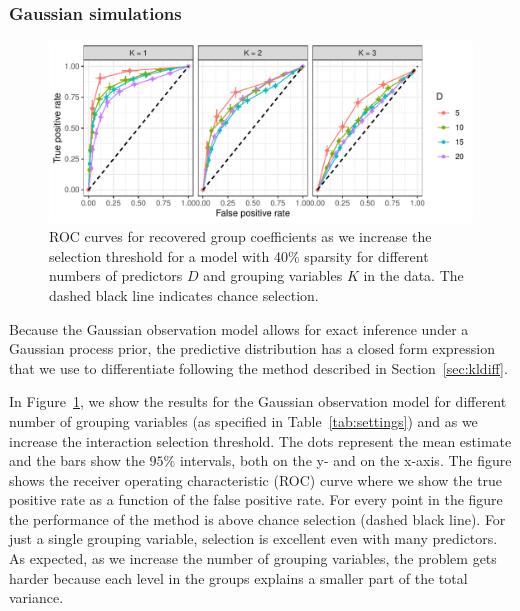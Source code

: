 \documentclass{article}
\begin{document}
\subsubsection{Gaussian simulations}

\begin{figure}[htb]
\centering
%
\centerline{\includegraphics[scale=0.8]{figs/pct_roc_uncertainty_gaussian_new_0_4_sparsity_noprior.pdf}}
\caption{ROC curves for recovered group coefficients as we increase the selection threshold for a model with 40\% sparsity for different numbers of predictors $D$ and grouping variables $K$ in the data. The dashed black line indicates chance selection.}
\label{fig:res_gaussian_t3}
\end{figure}

Because the Gaussian observation model allows for exact inference under a Gaussian process prior, the predictive distribution has a closed form expression that we use to differentiate following the method described in Section~\ref{sec:kldiff}.

In Figure~\ref{fig:res_gaussian_t3}, we show the results for the Gaussian observation model for different number of grouping variables (as specified in Table~\ref{tab:settings}) and as we increase the interaction selection threshold.
The dots represent the mean estimate and the bars show the $95$\% intervals, both on the y- and on the x-axis.
%
%
%
The figure shows the receiver operating characteristic (ROC) curve where we show the true positive rate as a function of the false positive rate.
For every point in the figure the performance of the method is above chance selection (dashed black line). For just a single grouping variable, 
%
selection is excellent even with many predictors.
%
As expected, as we increase the number of grouping variables, the problem gets harder because each
level in the groups explains a smaller part of the total variance.
%
%


%
%
%
%
%
\end{document}
